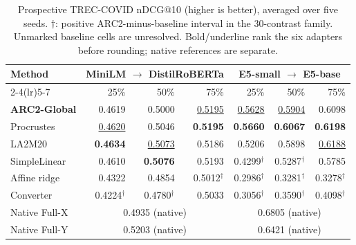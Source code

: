 \begin{table}[t]
\centering
\small
\setlength{\tabcolsep}{4pt}
\caption{Prospective TREC-COVID nDCG@10 (higher is better), averaged over five seeds. $\dagger$: positive ARC2-minus-baseline interval in the 30-contrast family. Unmarked baseline cells are unresolved. Bold/underline rank the six adapters before rounding; native references are separate.}\label{tab:trec}
\begin{tabular}{lrrrrrr}
\toprule
Method & \multicolumn{3}{c}{MiniLM $\rightarrow$ DistilRoBERTa} & \multicolumn{3}{c}{E5-small $\rightarrow$ E5-base} \\
\cmidrule(lr){2-4}\cmidrule(lr){5-7}
 & 25\% & 50\% & 75\% & 25\% & 50\% & 75\% \\
\midrule
\rowcolor{arcPale}\textbf{ARC2-Global} & 0.4619 & 0.5000 & \underline{0.5195} & \underline{0.5628} & \underline{0.5904} & 0.6098 \\
Procrustes & \underline{0.4620} & 0.5046 & \textbf{0.5195} & \textbf{0.5660} & \textbf{0.6067} & \textbf{0.6198} \\
LA2M20 & \textbf{0.4634} & \underline{0.5073} & 0.5186 & 0.5206 & 0.5898 & \underline{0.6188} \\
SimpleLinear & 0.4610 & \textbf{0.5076} & 0.5193 & 0.4299$^{\dagger}$ & 0.5287$^{\dagger}$ & 0.5785 \\
Affine ridge & 0.4322 & 0.4854 & 0.5012$^{\dagger}$ & 0.2986$^{\dagger}$ & 0.3281$^{\dagger}$ & 0.3278$^{\dagger}$ \\
Converter & 0.4224$^{\dagger}$ & 0.4780$^{\dagger}$ & 0.5033 & 0.3056$^{\dagger}$ & 0.3590$^{\dagger}$ & 0.4098$^{\dagger}$ \\
\midrule
Native Full-X & \multicolumn{3}{c}{0.4935 (native)} & \multicolumn{3}{c}{0.6805 (native)} \\
Native Full-Y & \multicolumn{3}{c}{0.5203 (native)} & \multicolumn{3}{c}{0.6421 (native)} \\
\bottomrule
\end{tabular}
\end{table}
